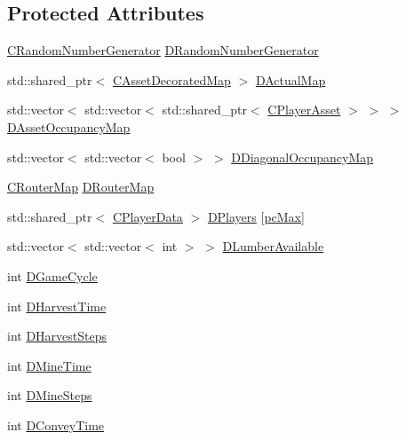 \subsection*{Protected Attributes}
\begin{DoxyCompactItemize}
\item 
\hyperlink{classCRandomNumberGenerator}{C\+Random\+Number\+Generator} \hyperlink{classCGameModel_a3fb9b6b40f397c022087f381f63954b9}{D\+Random\+Number\+Generator}
\item 
std\+::shared\+\_\+ptr$<$ \hyperlink{classCAssetDecoratedMap}{C\+Asset\+Decorated\+Map} $>$ \hyperlink{classCGameModel_ace04c3b62d6b71e20d1ed5460c0c3cee}{D\+Actual\+Map}
\item 
std\+::vector$<$ std\+::vector$<$ std\+::shared\+\_\+ptr$<$ \hyperlink{classCPlayerAsset}{C\+Player\+Asset} $>$ $>$ $>$ \hyperlink{classCGameModel_a2207654c461a3654c6d765dd5421373f}{D\+Asset\+Occupancy\+Map}
\item 
std\+::vector$<$ std\+::vector$<$ bool $>$ $>$ \hyperlink{classCGameModel_a30e26a862e4eb282a275ed192017c248}{D\+Diagonal\+Occupancy\+Map}
\item 
\hyperlink{classCRouterMap}{C\+Router\+Map} \hyperlink{classCGameModel_a37d0b5536c88a3e6ec16f46e7a413adf}{D\+Router\+Map}
\item 
std\+::shared\+\_\+ptr$<$ \hyperlink{classCPlayerData}{C\+Player\+Data} $>$ \hyperlink{classCGameModel_a524436c3560b10e1c6d6fdd0b66565dc}{D\+Players} \mbox{[}\hyperlink{GameDataTypes_8h_aafb0ca75933357ff28a6d7efbdd7602fa594a5c8dd3987f24e8a0f23f1a72cd34}{pc\+Max}\mbox{]}
\item 
std\+::vector$<$ std\+::vector$<$ int $>$ $>$ \hyperlink{classCGameModel_ae0bad49626fc5b7bdf8b3fe6a4187462}{D\+Lumber\+Available}
\item 
int \hyperlink{classCGameModel_a80bf86a6c1d75229d5d0f441f6313a1c}{D\+Game\+Cycle}
\item 
int \hyperlink{classCGameModel_a0160295e3cf06b7bbcb9247bc49e3156}{D\+Harvest\+Time}
\item 
int \hyperlink{classCGameModel_a719733742e1340921a12efce992b07fe}{D\+Harvest\+Steps}
\item 
int \hyperlink{classCGameModel_ab7bd9d3b4852d539aa605177ae2f27e8}{D\+Mine\+Time}
\item 
int \hyperlink{classCGameModel_a9f3d8b652f62a0a1b993cb2402800203}{D\+Mine\+Steps}
\item 
int \hyperlink{classCGameModel_a4452faa5aa4b062cde343ccd24166232}{D\+Convey\+Time}
\item 

\end{DoxyCompactItemize}
